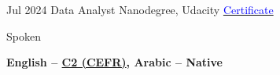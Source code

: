 \documentclass[9pt]{developercv} %
\begin{document}
\vspace{-10 pt}
\begin{entrylist}
    \entry
        {Jul 2024}
        {Data Analyst Nanodegree, Udacity}
        {\href{https://www.udacity.com/certificate/e/3aa7c17a-0cbc-11ef-b565-af2bfee1c67d}{\textcolor{blue}{Certificate}}}
        {\vspace{-12pt}}
\end{entrylist}
\vspace{-10pt}
\hspace*{4.6mm}\parbox[t]{0.20\textwidth}{\small Spoken}\parbox[t]{0.75\textwidth}{\textbf{English -- \href{https://cert.efset.org/Lymieh}{C2 (CEFR)}, Arabic -- Native}}
\end{document}
